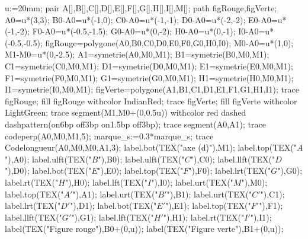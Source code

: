     \begin{center}
        \begin{Geometrie}[CoinHD={(18u,10u)}]
            u:=20mm;
            pair A[],B[],C[],D[],E[],F[],G[],H[],I[],M[];
            path figRouge,figVerte;
            A0=u*(3,3);
            B0-A0=u*(-1,0);
            C0-A0=u*(-1,-1);
            D0-A0=u*(-2,-2);
            E0-A0=u*(-1,-2);
            F0-A0=u*(-0.5,-1.5);
            G0-A0=u*(0,-2);
            H0-A0=u*(0,-1);
            I0-A0=u*(-0.5,-0.5);
            figRouge=polygone(A0,B0,C0,D0,E0,F0,G0,H0,I0);
            M0-A0=u*(1,0);
            M1-M0=u*(0,-2.5);
            A1=symetrie(A0,M0,M1);
            B1=symetrie(B0,M0,M1);
            C1=symetrie(C0,M0,M1);
            D1=symetrie(D0,M0,M1);
            E1=symetrie(E0,M0,M1);
            F1=symetrie(F0,M0,M1);
            G1=symetrie(G0,M0,M1);
            H1=symetrie(H0,M0,M1);
            I1=symetrie(I0,M0,M1);
            figVerte=polygone(A1,B1,C1,D1,E1,F1,G1,H1,I1);
            trace figRouge;
            fill figRouge withcolor IndianRed;        
            trace figVerte;
            fill figVerte withcolor LightGreen;
            trace segment(M1,M0+(0,0.5u)) withcolor red dashed dashpattern(on6bp off3bp on1.5bp off3bp);
            trace segment(A0,A1);
            trace codeperp(A0,M0,M1,5);
            marque_s:=0.3*marque_s;
            trace Codelongueur(A0,M0,M0,A1,3);
            label.bot(TEX("axe (d)"),M1);
            label.top(TEX("$A$"),A0);
            label.ulft(TEX("$B$"),B0);
            label.ulft(TEX("$C$"),C0);
            label.llft(TEX("$D$"),D0);
            label.bot(TEX("$E$"),E0);
            label.top(TEX("$F$"),F0);
            label.lrt(TEX("$G$"),G0);
            label.rt(TEX("$H$"),H0);
            label.lft(TEX("$I$"),I0);
            label.urt(TEX("$M$"),M0);
            label.top(TEX("$A'$"),A1);
            label.urt(TEX("$B'$"),B1);
            label.urt(TEX("$C'$"),C1);
            label.lrt(TEX("$D'$"),D1);
            label.bot(TEX("$E'$"),E1);
            label.top(TEX("$F'$"),F1);
            label.llft(TEX("$G'$"),G1);
            label.lft(TEX("$H'$"),H1);
            label.rt(TEX("$I'$"),I1);
            label(TEX("Figure rouge"),B0+(0,u));
            label(TEX("Figure verte"),B1+(0,u));
        \end{Geometrie}
    \end{center}

